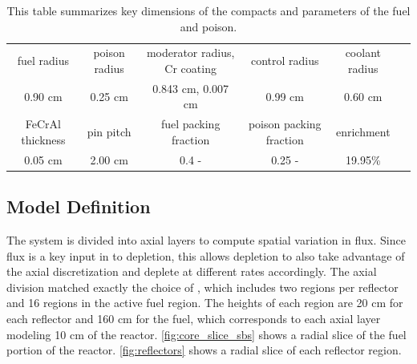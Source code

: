 \documentclass[letterpaper]{physor2024}
\begin{document}
\begin{table}[h!]
    \centering
    \begin{tabular}{|c|c|c|c|c|c|}
    \hline
    fuel radius & poison radius & moderator radius, Cr coating & control radius & coolant radius \\
    0.90 cm & 0.25 cm   & 0.843 cm, 0.007 cm & 0.99 cm    & 0.60 cm  \\
    \hline
    FeCrAl thickness & pin pitch & fuel packing fraction & poison packing fraction & enrichment \\
    0.05 cm & 2.00 cm  & 0.4 -  & 0.25 - & 19.95\% \\
    \hline
    \end{tabular}
    \caption{This table summarizes key dimensions of the compacts and parameters of the fuel and poison.}
    \label{tab:dimensions}
\end{table}
\vspace*{-0.5cm}
\subsection{Model Definition}\label{sec:model_def}
The system is divided into axial layers to compute spatial variation in flux. Since flux is a key input in to depletion, this allows depletion to also take advantage of the axial discretization and deplete at different rates accordingly. The axial division matched exactly the choice of \cite{Abdelhameed-ANS-2022}, which includes two regions per reflector and 16 regions in the active fuel region. The heights of each region are 20 cm for each reflector and 160 cm for the fuel, which corresponds to each axial layer modeling 10 cm of the reactor. \cref{fig:core_slice_sbs} shows a radial slice of the fuel portion of the reactor. \cref{fig:reflectors} shows a radial slice of each reflector region.
\end{document}
